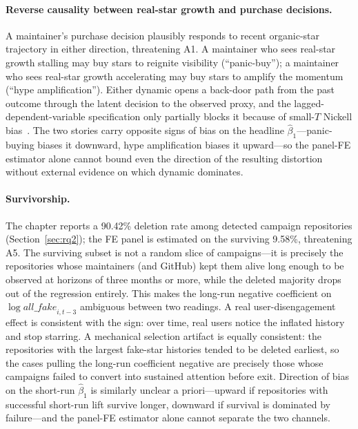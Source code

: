 \paragraph{Reverse causality between real-star growth and purchase decisions.}
A maintainer's purchase decision plausibly responds to recent organic-star trajectory in either direction, threatening A1.
A maintainer who sees real-star growth stalling may buy stars to reignite visibility (``panic-buy''); a maintainer who sees real-star growth accelerating may buy stars to amplify the momentum (``hype amplification'').
Either dynamic opens a back-door path from the past outcome through the latent decision to the observed proxy, and the lagged-dependent-variable specification only partially blocks it because of small-$T$ Nickell bias~\cite{nickell1981biases}.
The two stories carry opposite signs of bias on the headline $\hat\beta_1$---panic-buying biases it downward, hype amplification biases it upward---so the panel-FE estimator alone cannot bound even the direction of the resulting distortion without external evidence on which dynamic dominates.

\paragraph{Survivorship.}
The chapter reports a 90.42\% deletion rate among detected campaign repositories (Section~\ref{sec:rq2}); the FE panel is estimated on the surviving 9.58\%, threatening A5.
The surviving subset is not a random slice of campaigns---it is precisely the repositories whose maintainers (and GitHub) kept them alive long enough to be observed at horizons of three months or more, while the deleted majority drops out of the regression entirely.
This makes the long-run negative coefficient on $\log \textit{all\_fake}_{i, t-3}$ ambiguous between two readings.
A real user-disengagement effect is consistent with the sign: over time, real users notice the inflated history and stop starring.
A mechanical selection artifact is equally consistent: the repositories with the largest fake-star histories tended to be deleted earliest, so the cases pulling the long-run coefficient negative are precisely those whose campaigns failed to convert into sustained attention before exit.
Direction of bias on the short-run $\hat\beta_1$ is similarly unclear a priori---upward if repositories with successful short-run lift survive longer, downward if survival is dominated by failure---and the panel-FE estimator alone cannot separate the two channels.

